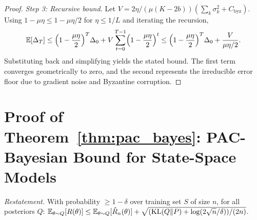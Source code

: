 \begin{proof}
\textit{Step 3: Recursive bound.} Let $V = 2\eta/(\mu(K{-}2b))(\sum_k\sigma_k^2 + C_{\mathrm{byz}})$. Using $1-\mu\eta\le 1-\mu\eta/2$ for $\eta\le 1/L$ and iterating the recursion,
\begin{equation}
\mathbb{E}[\Delta_T]
\le \Bigl(1-\frac{\mu\eta}{2}\Bigr)^T \Delta_0 + V\sum_{t=0}^{T-1}\Bigl(1-\frac{\mu\eta}{2}\Bigr)^t
\le \Bigl(1-\frac{\mu\eta}{2}\Bigr)^T \Delta_0 + \frac{V}{\mu\eta/2}.
\end{equation}
Substituting back and simplifying yields the stated bound. The first term converges geometrically to zero, and the second represents the irreducible error floor due to gradient noise and Byzantine corruption.
\end{proof}


\section{Proof of Theorem~\ref{thm:pac_bayes}: PAC-Bayesian Bound for State-Space Models}
\label{app:proof_pac}

\noindent\textit{Restatement.} With probability $\ge 1-\delta$ over training set $S$ of size $n$, for all posteriors $Q$: $\mathbb{E}_{\theta\sim Q}[R(\theta)]\le\mathbb{E}_{\theta\sim Q}[\hat{R}_n(\theta)] + \sqrt{(\mathrm{KL}(Q\|P)+\log(2\sqrt{n}/\delta))/(2n)}$.

